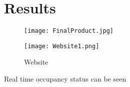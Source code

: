 \chapter{Results}

\begin{figure}[ht]
\begin{center}

\texttt{[image: FinalProduct.jpg]}


\end{center}
\end{figure}


\newpage 

\begin{figure}[ht]
\begin{center}

\texttt{[image: Website1.png]}
\caption{Website}

\label{fig:Site2}
\end{center}
\end{figure}

\par Real time occupancy status can be seen 


